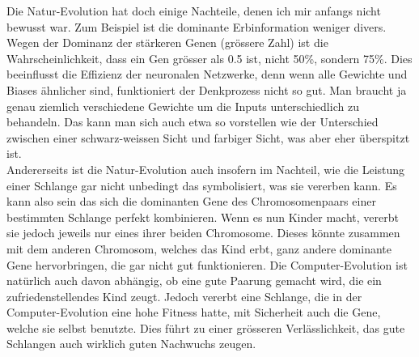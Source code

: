 \documentclass[11pt,a4paper,ngerman]{article}
\begin{document}
Die Natur-Evolution hat doch einige Nachteile, denen ich mir anfangs nicht bewusst war. Zum Beispiel ist die dominante Erbinformation weniger divers. Wegen der Dominanz der stärkeren Genen (grössere Zahl) ist die Wahrscheinlichkeit, dass ein Gen grösser als 0.5 ist, nicht 50\%, sondern 75\%. Dies beeinflusst die Effizienz der neuronalen Netzwerke, denn wenn alle Gewichte und Biases ähnlicher sind, funktioniert der Denkprozess nicht so gut. Man braucht ja genau ziemlich verschiedene Gewichte um die Inputs unterschiedlich zu behandeln. Das kann man sich auch etwa so vorstellen wie der Unterschied zwischen einer schwarz-weissen Sicht und farbiger Sicht, was aber eher überspitzt ist.\\

Andererseits ist die Natur-Evolution auch insofern im Nachteil, wie die Leistung einer Schlange gar nicht unbedingt das symbolisiert, was sie vererben kann. Es kann also sein das sich die dominanten Gene des Chromosomenpaars einer bestimmten Schlange perfekt kombinieren. Wenn es nun Kinder macht, vererbt sie jedoch jeweils nur eines ihrer beiden Chromosome. Dieses könnte zusammen mit dem anderen Chromosom, welches das Kind erbt, ganz andere dominante Gene hervorbringen, die gar nicht gut funktionieren. Die Computer-Evolution ist natürlich auch davon abhängig, ob eine gute Paarung gemacht wird, die ein zufriedenstellendes Kind zeugt. Jedoch vererbt eine Schlange, die in der Computer-Evolution eine hohe Fitness hatte, mit Sicherheit auch die Gene, welche sie selbst benutzte. Dies führt zu einer grösseren Verlässlichkeit, das gute Schlangen auch wirklich guten Nachwuchs zeugen.\\
\end{document}
